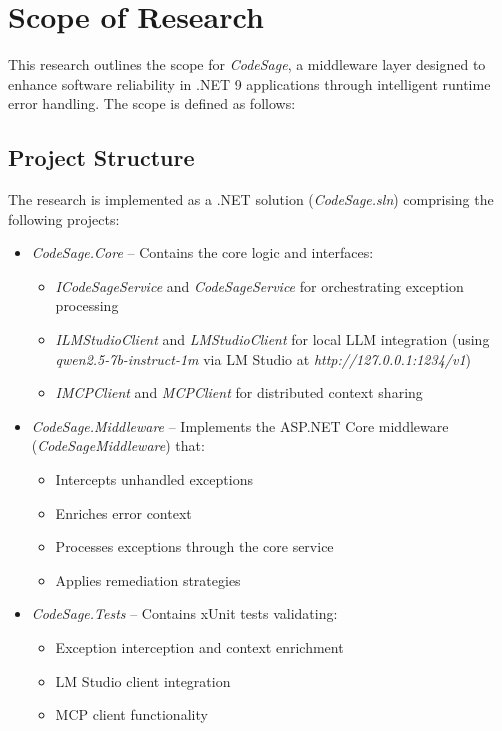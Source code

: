 \section{Scope of Research}

This research outlines the scope for \textit{CodeSage}, a middleware layer designed to enhance software reliability in .NET 9 applications through intelligent runtime error handling. The scope is defined as follows:

\subsection{Project Structure}
The research is implemented as a .NET solution (\textit{CodeSage.sln}) comprising the following projects:

\begin{itemize}
    \item \textit{CodeSage.Core} – Contains the core logic and interfaces:
    \begin{itemize}
        \item \textit{ICodeSageService} and \textit{CodeSageService} for orchestrating exception processing
        \item \textit{ILMStudioClient} and \textit{LMStudioClient} for local LLM integration (using \textit{qwen2.5-7b-instruct-1m} via LM Studio at \textit{http://127.0.0.1:1234/v1})
        \item \textit{IMCPClient} and \textit{MCPClient} for distributed context sharing
    \end{itemize}
    \item \textit{CodeSage.Middleware} – Implements the ASP.NET Core middleware (\textit{CodeSageMiddleware}) that:
    \begin{itemize}
        \item Intercepts unhandled exceptions
        \item Enriches error context
        \item Processes exceptions through the core service
        \item Applies remediation strategies
    \end{itemize}
    \item \textit{CodeSage.Tests} – Contains xUnit tests validating:
    \begin{itemize}
        \item Exception interception and context enrichment
        \item LM Studio client integration
        \item MCP client functionality

\end{itemize}
\end{itemize}
